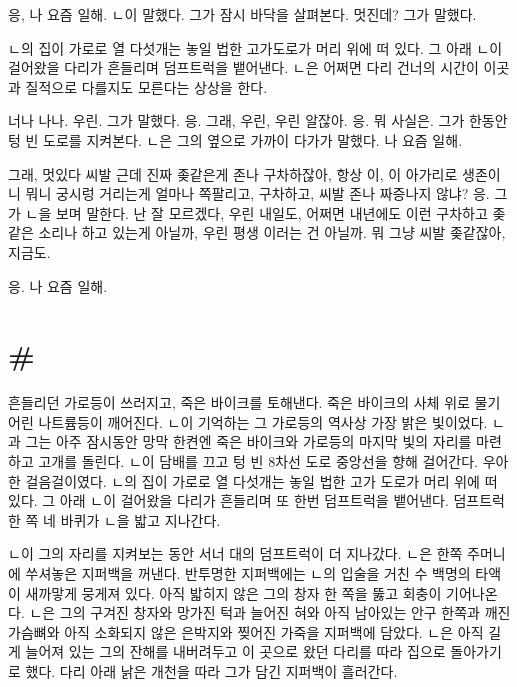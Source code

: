 \documentclass[a5paper,10pt, twoside, openright]{memoir}
\begin{document}
	응, 나 요즘 일해. ㄴ이 말했다. 그가 잠시 바닥을 살펴본다. 멋진데? 그가 말했다. 

	ㄴ의 집이 가로로 열 다섯개는 놓일 법한 고가도로가 머리 위에 떠 있다. 그 아래 ㄴ이 걸어왔을 다리가 흔들리며 덤프트럭을 뱉어낸다. ㄴ은 어쩌면 다리 건너의 시간이 이곳과 질적으로 다를지도 모른다는 상상을 한다. 

	너나 나나. 우린. 그가 말했다. 응. 그래, 우린, 우린 알잖아. 응. 뭐 사실은. 그가 한동안 텅 빈 도로를 지켜본다. ㄴ은 그의 옆으로 가까이 다가가 말했다. 나 요즘 일해. 

	그래, 멋있다 씨발 근데 진짜 좆같은게 존나 구차하잖아, 항상 이, 이 아가리로 생존이니 뭐니 궁시렁 거리는게 얼마나 쪽팔리고, 구차하고, 씨발 존나 짜증나지 않냐? 응. 그가 ㄴ을 보며 말한다. 난 잘 모르겠다, 우린 내일도, 어쩌면 내년에도 이런 구차하고 좆같은 소리나 하고 있는게 아닐까, 우린 평생 이러는 건 아닐까. 뭐 그냥 씨발 좆같잖아, 지금도. 

	응. 나 요즘 일해.

	\section{\#}
	흔들리던 가로등이 쓰러지고, 죽은 바이크를 토해낸다. 죽은 바이크의 사체 위로 물기 어린 나트륨등이 깨어진다. ㄴ이 기억하는 그 가로등의 역사상 가장 밝은 빛이었다. ㄴ과 그는 아주 잠시동안 망막 한켠엔 죽은 바이크와 가로등의 마지막 빛의 자리를 마련하고 고개를 돌린다. ㄴ이 담배를 끄고 텅 빈 8차선 도로 중앙선을 향해 걸어간다. 우아한 걸음걸이였다. ㄴ의 집이 가로로 열 다섯개는 놓일 법한 고가 도로가 머리 위에 떠 있다. 그 아래 ㄴ이 걸어왔을 다리가 흔들리며 또 한번 덤프트럭을 뱉어낸다. 덤프트럭 한 쪽 네 바퀴가 ㄴ을 밟고 지나간다. 

	ㄴ이 그의 자리를 지켜보는 동안 서너 대의 덤프트럭이 더 지나갔다. ㄴ은 한쪽 주머니에 쑤셔놓은 지퍼백을 꺼낸다. 반투명한 지퍼백에는 ㄴ의 입술을 거친 수 백명의 타액이 새까맣게 뭉게져 있다. 아직 밟히지 않은 그의 창자 한 쪽을 뚫고 회충이 기어나온다. ㄴ은 그의 구겨진 창자와 망가진 턱과 늘어진 혀와 아직 남아있는 안구 한쪽과 깨진 가슴뼈와 아직 소화되지 않은 은박지와 찢어진 가죽을 지퍼백에 담았다. ㄴ은 아직 길게 늘어져 있는 그의 잔해를 내버려두고 이 곳으로 왔던 다리를 따라 집으로 돌아가기로 했다. 다리 아래 낡은 개천을 따라 그가 담긴 지퍼백이 흘러간다.

	\newpage{}
	\section*{}
	
\backmatter %
\end{document}

